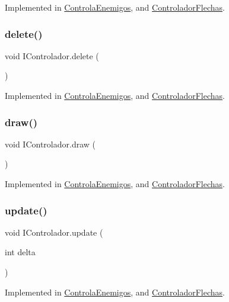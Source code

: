 Implemented in \mbox{\hyperlink{class_controla_enemigos_a891536374c60a0b946b72a3c02458952}{Controla\+Enemigos}}, and \mbox{\hyperlink{class_controlador_flechas_a0f13f2616d99a402e2b5fe2385dd208f}{Controlador\+Flechas}}.

\mbox{\label{interface_i_controlador_a6a799d4959078e9b84d9de7fee44e0ba}} 
\subsubsection{\texorpdfstring{delete()}{delete()}}
{\footnotesize\ttfamily void I\+Controlador.\+delete (\begin{DoxyParamCaption}{ }\end{DoxyParamCaption})}



Implemented in \mbox{\hyperlink{class_controla_enemigos_a3ae667fde8e2bf5a38a4ada28ac6db26}{Controla\+Enemigos}}, and \mbox{\hyperlink{class_controlador_flechas_abc0b5e9945efd4696c827fecf42503df}{Controlador\+Flechas}}.

\mbox{\label{interface_i_controlador_a220648ff53334f380d52e2d2ec78e2e8}} 
\subsubsection{\texorpdfstring{draw()}{draw()}}
{\footnotesize\ttfamily void I\+Controlador.\+draw (\begin{DoxyParamCaption}{ }\end{DoxyParamCaption})}



Implemented in \mbox{\hyperlink{class_controla_enemigos_af3ef61229a21ef509dcf8397e870666e}{Controla\+Enemigos}}, and \mbox{\hyperlink{class_controlador_flechas_a4a4d76786169ef23360cbe57b8c81df2}{Controlador\+Flechas}}.

\mbox{\label{interface_i_controlador_a06ccd4613ae1662a3a45620104c5224b}} 
\subsubsection{\texorpdfstring{update()}{update()}}
{\footnotesize\ttfamily void I\+Controlador.\+update (\begin{DoxyParamCaption}\item[{int}]{delta }\end{DoxyParamCaption})}



Implemented in \mbox{\hyperlink{class_controla_enemigos_a0f43235e03225c9fbd077c5bfd2df923}{Controla\+Enemigos}}, and \mbox{\hyperlink{class_controlador_flechas_afcc63da58b6dd22715c017593731577e}{Controlador\+Flechas}}.

